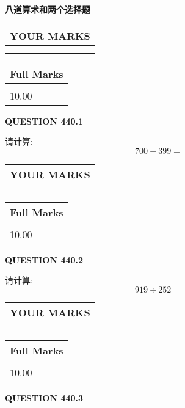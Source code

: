 \documentclass{ctexart}
\begin{document}
   
 \vspace{0.2in}
{\LARGE {\textbf{ 八道算术和两个选择题}}}
   
   
  
\vspace{0.2in}
  
\noindent\begin{tabular}{|l|}
\hline
 YOUR MARKS  \\
\hline
 \\ 
 \\ 
\hline
\end{tabular}
\hspace{0.05in} \begin{tabular}{|l|}
\hline
 Full Marks  \\
\hline
 \\ 
10.00 \\
\hline
\end{tabular}
{\textbf{\Large{QUESTION
440.1 
}}}
  
  
 
请计算:
\begin{equation}
700 +  %
399 = \nonumber
\end{equation}
 

 

 
  
\vspace{0.2in}
  
\noindent\begin{tabular}{|l|}
\hline
 YOUR MARKS  \\
\hline
 \\ 
 \\ 
\hline
\end{tabular}
\hspace{0.05in} \begin{tabular}{|l|}
\hline
 Full Marks  \\
\hline
 \\ 
10.00 \\
\hline
\end{tabular}
{\textbf{\Large{QUESTION
440.2 
}}}
  
  
 
请计算:
\begin{equation}
919  \div    %
252 = \nonumber
\end{equation}
 

 

 
  
\vspace{0.2in}
  
\noindent\begin{tabular}{|l|}
\hline
 YOUR MARKS  \\
\hline
 \\ 
 \\ 
\hline
\end{tabular}
\hspace{0.05in} \begin{tabular}{|l|}
\hline
 Full Marks  \\
\hline
 \\ 
10.00 \\
\hline
\end{tabular}
{\textbf{\Large{QUESTION
440.3 
}}}
  
\end{document}
